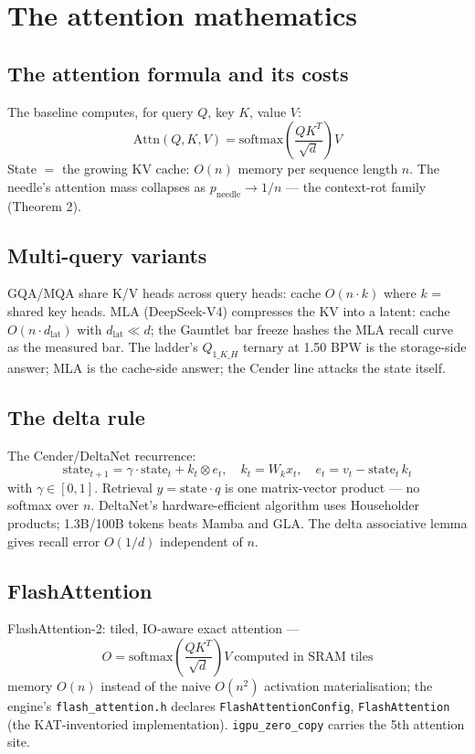 \chapter{The attention mathematics}

\section{The attention formula and its costs}

The baseline computes, for query $Q$, key $K$, value $V$:
\[ \mathrm{Attn}(Q,K,V) = \mathrm{softmax}\!\left(\frac{QK^T}{\sqrt{d}}\right) V \]
State $=$ the growing KV cache: $O(n)$ memory per sequence length $n$. The needle's attention
mass collapses as $p_{\text{needle}} \to 1/n$ --- the context-rot family (Theorem 2).

\section{Multi-query variants}

GQA/MQA share K/V heads across query heads: cache $O(n \cdot k)$ where $k$ = shared key heads.
MLA (DeepSeek-V4) compresses the KV into a latent: cache $O(n \cdot d_{\text{lat}})$ with
$d_{\text{lat}} \ll d$; the Gauntlet bar freeze hashes the MLA recall curve as the measured
bar. The ladder's $Q_{1\_K\_H}$ ternary at 1.50 BPW is the storage-side answer; MLA is the
cache-side answer; the Cender line attacks the state itself.

\section{The delta rule}

The Cender/DeltaNet recurrence:
\[ \text{state}_{t+1} = \gamma\cdot\text{state}_t + k_t \otimes e_t, \quad
   k_t = W_k x_t, \quad e_t = v_t - \text{state}_t\, k_t \]
with $\gamma \in [0,1]$. Retrieval $y = \text{state} \cdot q$ is one matrix-vector product ---
no softmax over $n$. DeltaNet's hardware-efficient algorithm uses Householder products;
1.3B/100B tokens beats Mamba and GLA. The delta associative lemma gives recall error
$O(1/d)$ independent of $n$.

\section{FlashAttention}

FlashAttention-2: tiled, IO-aware exact attention ---
\[ O = \mathrm{softmax}\!\left(\frac{QK^T}{\sqrt{d}}\right)V \ \text{computed in SRAM tiles} \]
memory $O(n)$ instead of the naive $O(n^2)$ activation materialisation; the engine's
\texttt{flash\_attention.h} declares \texttt{FlashAttentionConfig}, \texttt{FlashAttention}
(the KAT-inventoried implementation). \texttt{igpu\_zero\_copy} carries the 5th attention
site.

